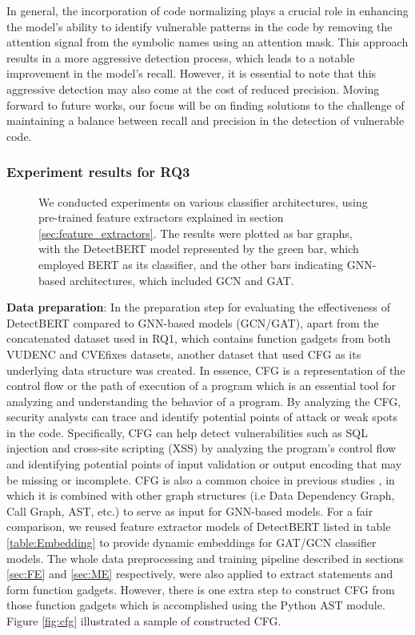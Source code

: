 \documentclass{ieeeaccess}
\begin{document}
\par In general, the incorporation of code normalizing plays a crucial role in enhancing the model's ability to identify vulnerable patterns in the code by removing the attention signal from the symbolic names using an attention mask. This approach results in a more aggressive detection process, which leads to a notable improvement in the model's recall. However, it is essential to note that this aggressive detection may also come at the cost of reduced precision. Moving forward to future works, our focus will be on finding solutions to the challenge of maintaining a balance between recall and precision in the detection of vulnerable code.
 

\subsubsection{Experiment results for RQ3}
\begin{figure}[h]
    \centering
    
    
    \caption{We conducted experiments on various classifier architectures, using pre-trained feature extractors explained in section \ref{sec:feature_extractors}. The results were plotted as bar graphs, with the DetectBERT model represented by the green bar, which employed BERT as its classifier, and the other bars indicating GNN-based architectures, which included GCN and GAT.} 
 \label{fig:RQ3_graphs}
\end{figure}
\textbf{Data  preparation}: In the preparation step for evaluating the effectiveness of DetectBERT compared to GNN-based models (GCN/GAT), apart from the concatenated dataset used in RQ1, which contains function gadgets from both VUDENC and CVEfixes datasets,  another dataset that used CFG as its underlying data structure was created.  In essence, CFG is a representation of the control flow or the path of execution of a program which is an essential tool for analyzing and understanding the behavior of a program. By analyzing the CFG, security analysts can trace and identify potential points of attack or weak spots in the code. Specifically, CFG can help detect vulnerabilities such as  SQL injection and cross-site scripting (XSS)  by analyzing the program's control flow and identifying potential points of input validation or output encoding that may be missing or incomplete. CFG is also a common choice in previous studies \cite{Linevd,Are,devign,DeepWukong,MVD}, in which it is combined with other graph structures (i.e Data Dependency Graph, Call Graph, AST, etc.)  to serve as input for GNN-based models. For a fair comparison,  we reused feature extractor models of DetectBERT listed in table \ref{table:Embedding} to provide dynamic embeddings for GAT/GCN classifier models.  The whole data preprocessing and training pipeline  described in sections \ref{sec:FE} and \ref{sec:ME} respectively, were also applied to extract statements and form function gadgets. However, there is one  extra step to  construct CFG from those function gadgets which is accomplished  using the Python AST module. Figure \ref{fig:cfg} illustrated a sample of constructed  CFG. 
 
\end{document}
